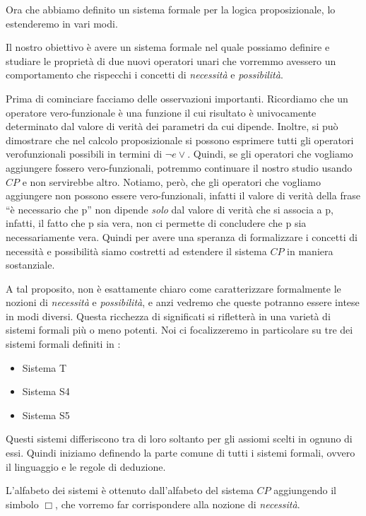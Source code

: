 \documentclass[a4paper, titlepage, 12pt]{report}
\begin{document}
Ora che abbiamo definito un sistema formale per la logica proposizionale,
lo estenderemo in vari modi.

Il nostro obiettivo è avere un sistema formale nel quale possiamo definire e studiare
le proprietà di due nuovi operatori unari che vorremmo avessero un comportamento che rispecchi
i concetti di \emph{necessità} e \emph{possibilità}.

Prima di cominciare facciamo delle osservazioni importanti.
Ricordiamo che un operatore vero-funzionale è una funzione il cui risultato
è univocamente determinato dal valore di verità dei parametri da cui dipende.
Inoltre, si può dimostrare che nel calcolo proposizionale si possono esprimere
tutti gli operatori verofunzionali possibili in termini di $\neg e \vee$.
Quindi, se gli operatori che vogliamo aggiungere fossero vero-funzionali, potremmo
continuare il nostro studio usando $CP$ e non servirebbe altro.
Notiamo, però, che gli operatori che vogliamo aggiungere non possono essere vero-funzionali,
infatti il valore di verità della frase ``è necessario che p'' non dipende \emph{solo}
dal valore di verità che si associa a p, infatti, il fatto che p sia vera, non ci permette
di concludere che p sia necessariamente vera. Quindi per avere una speranza di formalizzare
i concetti di necessità e possibilità siamo costretti ad estendere il sistema $CP$
in maniera sostanziale.

A tal proposito, non è esattamente chiaro come caratterizzare formalmente
le nozioni di \emph{necessità} e \emph{possibilità},
e anzi vedremo che queste potranno essere intese in modi diversi.
Questa ricchezza di significati si rifletterà in una varietà di sistemi formali più o meno potenti.
Noi ci focalizzeremo in particolare su tre dei sistemi formali definiti in \cite{IntroModale}:
\begin{itemize}
\item Sistema T
\item Sistema S4
\item Sistema S5
\end{itemize}

Questi sistemi differiscono tra di loro soltanto per gli assiomi scelti in ognuno di essi.
Quindi iniziamo definendo la parte comune di tutti i sistemi formali, ovvero il linguaggio
e le regole di deduzione.

L'alfabeto dei sistemi è ottenuto dall'alfabeto del sistema $CP$ aggiungendo il simbolo $\Box$,
che vorremo far corrispondere alla nozione di \emph{necessità}.
\end{document}
